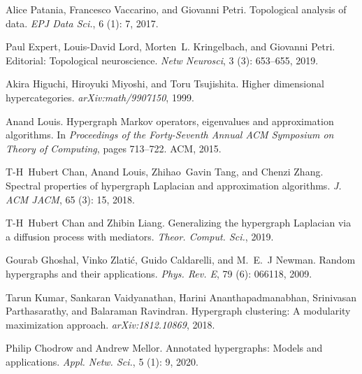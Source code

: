 Alice Patania, Francesco Vaccarino, and Giovanni Petri.
\newblock Topological analysis of data.
\newblock \emph{EPJ Data Sci.}, 6 (1): 7, 2017{}.

Paul Expert, Louis-David Lord, Morten~L. Kringelbach, and Giovanni Petri.
\newblock Editorial: {{Topological}} neuroscience.
\newblock \emph{Netw Neurosci}, 3 (3): 653--655, 2019.

Akira Higuchi, Hiroyuki Miyoshi, and Toru Tsujishita.
\newblock Higher dimensional hypercategories.
\newblock \emph{arXiv:math/9907150}, 1999.

Anand Louis.
\newblock Hypergraph {Markov} operators, eigenvalues and approximation
algorithms.
\newblock In \emph{Proceedings of the Forty-Seventh Annual {{ACM}} Symposium on
    {{Theory}} of Computing}, pages 713--722. {ACM}, 2015.

T-H~Hubert Chan, Anand Louis, Zhihao~Gavin Tang, and Chenzi Zhang.
\newblock Spectral properties of hypergraph {{Laplacian}} and approximation
algorithms.
\newblock \emph{J. ACM JACM}, 65 (3): 15, 2018.

T-H~Hubert Chan and Zhibin Liang.
\newblock Generalizing the hypergraph {Laplacian} via a diffusion process with
mediators.
\newblock \emph{Theor. Comput. Sci.}, 2019.

Gourab Ghoshal, Vinko Zlati{\'c}, Guido Caldarelli, and M.~E.~J Newman.
\newblock Random hypergraphs and their applications.
\newblock \emph{Phys. Rev. E}, 79 (6): 066118, 2009.

Tarun Kumar, Sankaran Vaidyanathan, Harini Ananthapadmanabhan, Srinivasan
Parthasarathy, and Balaraman Ravindran.
\newblock Hypergraph clustering: {{A}} modularity maximization approach.
\newblock \emph{arXiv:1812.10869}, 2018.

Philip Chodrow and Andrew Mellor.
\newblock Annotated hypergraphs: Models and applications.
\newblock \emph{Appl. Netw. Sci.}, 5 (1): 9, 2020.

